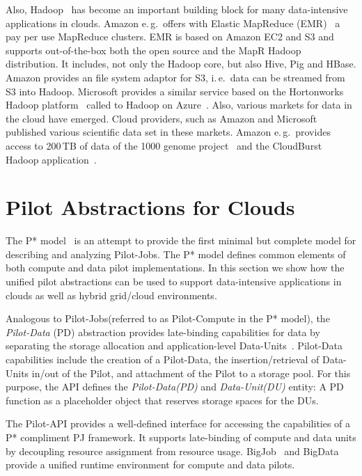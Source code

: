 \documentclass[times]{cpeauth}
\newcommand{\pilot}{Pilot\xspace}
\newcommand{\pilotjobs}{Pilot-Jobs\xspace}
\newcommand{\pilotcompute}{Pilot-Compute\xspace}
\newcommand{\pilotdata}{Pilot-Data\xspace}
\newcommand{\pd}{PD\xspace}
\newcommand{\dataunit}{Data-Unit\xspace}
\newcommand{\dataunits}{Data-Units\xspace}
\newcommand{\dus}{DUs\xspace}
\begin{document}
Also, Hadoop~\cite{hadoop} has become an important building block for
many data-intensive applications in clouds. Amazon e.\,g.\ offers with
Elastic MapReduce (EMR)~\cite{amazonemr} a pay per use MapReduce clusters. EMR
is based on Amazon EC2 and S3 and supports out-of-the-box both the open source
and the MapR Hadoop distribution. It includes, not only the Hadoop core, but
also Hive, Pig and HBase. Amazon provides an file system adaptor for S3,
i.\,e.\ data can be streamed from S3 into Hadoop. Microsoft provides a similar
service based on the Hortonworks Hadoop platform~\cite{hortonworks} called to
Hadoop on Azure~\cite{hadooponazure}. Also, various markets for data in the
cloud have emerged. Cloud providers, such as Amazon and Microsoft published
various scientific data set in these markets. Amazon e.\,g.\ provides access
to 200\,TB of data of the 1000 genome project~\cite{amazon-1000genomes} and
the CloudBurst Hadoop application~\cite{schatz2009}.



\section{Pilot Abstractions for Clouds}

The P* model~\cite{pstar12} is an attempt to provide the first minimal but
complete model for describing and analyzing \pilotjobs. The P* model defines
common elements of both compute and data pilot implementations. In this 
section we show how the unified pilot abstractions can be used to support 
data-intensive applications in clouds as well as hybrid grid/cloud 
environments.

Analogous to \pilotjobs (referred to as \pilotcompute in the P* model), the
{\it Pilot-Data} (PD) abstraction provides late-binding capabilities for data
by separating the storage allocation and application-level
\dataunits~\cite{pstar12}. \pilotdata capabilities include the creation of a 
\pilotdata, the insertion/retrieval of Data-Units in/out of the \pilot, and 
attachment of the \pilot to a storage pool. For this purpose, the API defines 
the {\it \pilotdata (PD)} and {\it \dataunit (DU)} entity: A \pd function as a
placeholder object that reserves storage spaces for the \dus. 

The \pilot-API provides a well-defined interface for accessing the
capabilities of a P* compliment PJ framework. It supports late-binding of
compute and data units by decoupling resource assignment from resource usage.
BigJob~\cite{saga_bigjob_condor_cloud} and 
BigData~\cite{Mantha:2012:PEF:2287016.2287020} provide a unified runtime 
environment for compute and data pilots.
\end{document}

